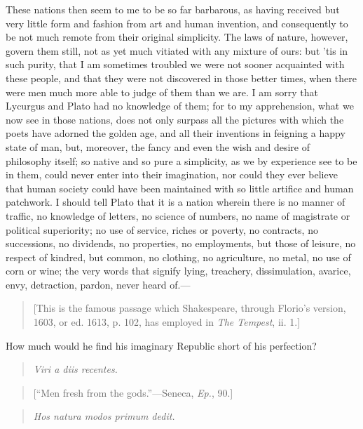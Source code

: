 \documentclass[twocolumn]{article}
\newcommand{\specialbreaks}[1]{\linebreak\newpage\noindent\setline{#1}}
\begin{document}
	These nations then seem to me to be so far barbarous, as having received but very little form and fashion from art and human invention, and consequently to be not much remote from their original simplicity. The laws of nature, however, govern them still, not as yet much vitiated with any mixture of ours: but ’tis in such purity, that I am sometimes troubled we were not sooner acquainted with these people, and that they were not discovered in those better times, when there were men much more able to judge of them than we are. I am sorry that Lycurgus and Plato had no knowledge of them; for to my apprehension, what we now see in those nations, does not only surpass all the pictures with \specialbreaks{213}which the poets have adorned the golden age, and all their inventions in feigning a happy state of man, but, moreover, the fancy and even the wish and desire of philosophy itself; so native and so pure a simplicity, as we by experience see to be in them, could never enter into their imagination, nor could they ever believe that human society could have been maintained with so little artifice and human patchwork. I should tell Plato that it is a nation wherein there is no manner of traffic, no knowledge of letters, no science of numbers, no name of magistrate or political superiority; no use of service, riches or poverty, no contracts, no successions, no dividends, no properties, no employments, but those of leisure, no respect of kindred, but common, no clothing, no agriculture, no metal, no use of corn or wine; the very words that signify lying, treachery, dissimulation, avarice, envy, detraction, pardon, never heard of.---

	\begin{quote}
		[This is the famous passage which Shakespeare, through Florio’s version, 1603, or ed. 1613, p. 102, has employed in \emph{The Tempest}, ii. 1.]
	\end{quote}
	
	How much would he find his imaginary Republic short of his perfection?

	\begin{quote}
		\noindent\emph{Viri a diis recentes.}
	\end{quote}
	
	\begin{quote}
		[``Men fresh from the gods.''---Seneca, \emph{Ep.}, 90.]
	\end{quote}

	\begin{quote}
		\noindent\emph{Hos natura modos primum dedit.}
	\end{quote}
	
\end{document}
